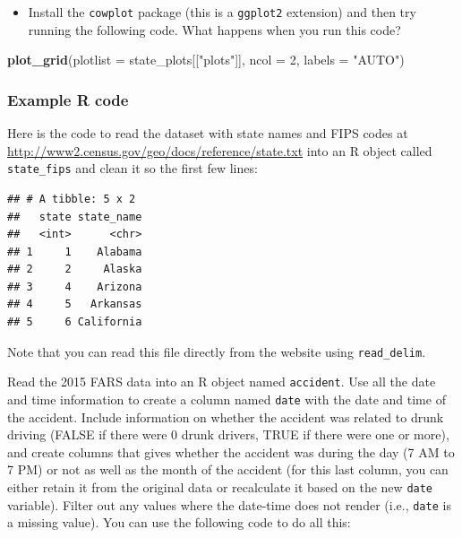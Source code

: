 \documentclass[]{book}
\makeatletter
\newenvironment{Shaded}{\begin{snugshade}}{\end{snugshade}}
\newcommand{\KeywordTok}[1]{\textcolor[rgb]{0.13,0.29,0.53}{\textbf{#1}}}
\newcommand{\DataTypeTok}[1]{\textcolor[rgb]{0.13,0.29,0.53}{#1}}
\newcommand{\DecValTok}[1]{\textcolor[rgb]{0.00,0.00,0.81}{#1}}
\newcommand{\StringTok}[1]{\textcolor[rgb]{0.31,0.60,0.02}{#1}}
\newcommand{\NormalTok}[1]{#1}
\providecommand{\tightlist}{%
  \setlength{\itemsep}{0pt}\setlength{\parskip}{0pt}}
\newenvironment{kframe}{%
\medskip{}
\setlength{\fboxsep}{.8em}
 \def\at@end@of@kframe{}%
 \ifinner\ifhmode%
  \def\at@end@of@kframe{\end{minipage}}%
  \begin{minipage}{\columnwidth}%
 \fi\fi%
 \def\FrameCommand##1{\hskip\@totalleftmargin \hskip-\fboxsep
 \colorbox{shadecolor}{##1}\hskip-\fboxsep
     \hskip-\linewidth \hskip-\@totalleftmargin \hskip\columnwidth}%
 \MakeFramed {\advance\hsize-\width
   \@totalleftmargin\z@ \linewidth\hsize
   \@setminipage}}%
 {\par\unskip\endMakeFramed%
 \at@end@of@kframe}
\renewenvironment{Shaded}{\begin{kframe}}{\end{kframe}}
\theoremstyle{definition}
\theoremstyle{definition}
\theoremstyle{definition}
\theoremstyle{remark}
\makeatother
\begin{document}
\begin{itemize}
\tightlist
\item
  Install the \texttt{cowplot} package (this is a \texttt{ggplot2}
  extension) and then try running the following code. What happens when
  you run this code?
\end{itemize}

\begin{Shaded}
\begin{Highlighting}[]
\KeywordTok{plot_grid}\NormalTok{(}\DataTypeTok{plotlist =}\NormalTok{ state_plots[[}\StringTok{"plots"}\NormalTok{]], }
          \DataTypeTok{ncol =} \DecValTok{2}\NormalTok{, }\DataTypeTok{labels =} \StringTok{"AUTO"}\NormalTok{)}
\end{Highlighting}
\end{Shaded}

\subsubsection{Example R code}\label{example-r-code-15}

Here is the code to read the dataset with state names and FIPS codes at
\url{http://www2.census.gov/geo/docs/reference/state.txt} into an R
object called \texttt{state\_fips} and clean it so the first few lines:

\begin{verbatim}
## # A tibble: 5 x 2
##   state state_name
##   <int>      <chr>
## 1     1    Alabama
## 2     2     Alaska
## 3     4    Arizona
## 4     5   Arkansas
## 5     6 California
\end{verbatim}

Note that you can read this file directly from the website using
\texttt{read\_delim}.

Read the 2015 FARS data into an R object named \texttt{accident}. Use
all the date and time information to create a column named \texttt{date}
with the date and time of the accident. Include information on whether
the accident was related to drunk driving (FALSE if there were 0 drunk
drivers, TRUE if there were one or more), and create columns that gives
whether the accident was during the day (7 AM to 7 PM) or not as well as
the month of the accident (for this last column, you can either retain
it from the original data or recalculate it based on the new
\texttt{date} variable). Filter out any values where the date-time does
not render (i.e., \texttt{date} is a missing value). You can use the
following code to do all this:
\end{document}
